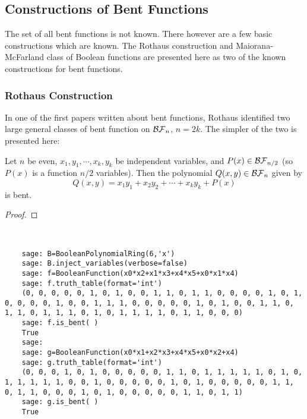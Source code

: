 
\subsection{Constructions of Bent Functions}\label{subsec:bent-constructions}
\par The set of all bent functions is not known. There however are a few basic
constructions which are known. The Rothaus construction and Maiorana-McFarland class of Boolean
functions are presented here as two of the known constructions for bent
functions.
\subsubsection{Rothaus Construction}
\par In one of the first papers written about bent functions, Rothaus identified
two large general classes of bent function on $\mathcal{BF}_n$, $n=2k$. The simpler of
the two is presented here:
\begin{proposition}
  Let $n$ be even, $x_1,y_1,\cdots,x_k,y_k$ be independent variables, and
  $P(x)\in\mathcal{BF}_{n/2}$ (so $P(x)$ is a function $n/2$ variables). Then the polynomial
  $Q(x,y)\in\mathcal{BF}_{n}$ given by
  \begin{equation}
    Q(x,y)=x_1y_1+x_2y_2+\cdots+x_ky_k+P(x)
  \end{equation}
  is bent.
\end{proposition}
\begin{proof}

\end{proof}

\begin{example}
  \ 
  \begin{lstlisting}
    sage: B=BooleanPolynomialRing(6,'x')
    sage: B.inject_variables(verbose=false)
    sage: f=BooleanFunction(x0*x2+x1*x3+x4*x5+x0*x1*x4)
    sage: f.truth_table(format='int')
    (0, 0, 0, 0, 0, 1, 0, 1, 0, 0, 1, 1, 0, 1, 1, 0, 0, 0, 0, 1, 0, 1, 0, 0, 0, 0, 1, 0, 0, 1, 1, 1, 0, 0, 0, 0, 0, 1, 0, 1, 0, 0, 1, 1, 0, 1, 1, 0, 1, 1, 1, 0, 1, 0, 1, 1, 1, 1, 0, 1, 1, 0, 0, 0)
    sage: f.is_bent( )
    True
    sage: 
    sage: g=BooleanFunction(x0*x1+x2*x3+x4*x5+x0*x2+x4)
    sage: g.truth_table(format='int')
    (0, 0, 0, 1, 0, 1, 0, 0, 0, 0, 0, 1, 1, 0, 1, 1, 1, 1, 1, 0, 1, 0, 1, 1, 1, 1, 1, 0, 0, 1, 0, 0, 0, 0, 0, 1, 0, 1, 0, 0, 0, 0, 0, 1, 1, 0, 1, 1, 0, 0, 0, 1, 0, 1, 0, 0, 0, 0, 0, 1, 1, 0, 1, 1)
    sage: g.is_bent( )
    True
  \end{lstlisting}
\end{example}
